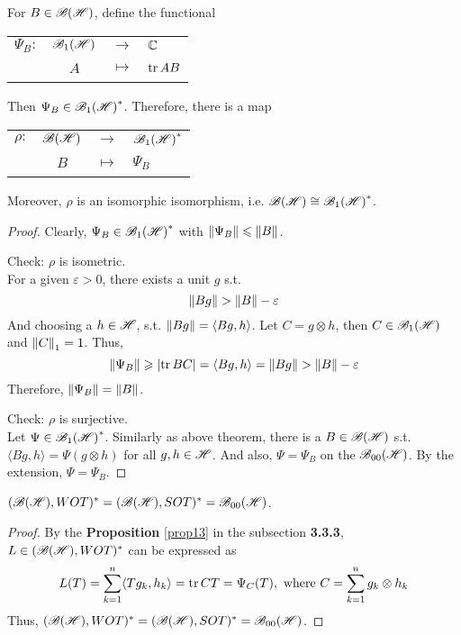 \documentclass[a4paper,11pt]{report}
\begin{document}
\begin{thm}
	For $B \in \mathscr{B(H)}$, define the functional
	\begin{center}
		\begin{tabular}{l c c l}
			$\Psi_B \colon$ & $\mathscr{B}_{1}\mathscr{(H)}$ & $\longrightarrow$ & $\mathbb{C}$ \\
			~ & $A$ & $\longmapsto$ & $\operatorname{tr}{AB}$
		\end{tabular}
	\end{center}
	Then $\Psi_B \in \mathscr{B}_{1}\mathscr{(H)}^{*}$. Therefore, there is a map
	\begin{center}
		\begin{tabular}{l c c l}
			$\rho \colon$ & $\mathscr{B(H)}$ & $\longrightarrow$ & $\mathscr{B}_{1}\mathscr{(H)}^{*}$ \\
			~ & $B$ & $\longmapsto$ & $\Psi_B$
		\end{tabular}
	\end{center}
	Moreover, $\rho$ is an isomorphic isomorphism, i.e. $\mathscr{B(H)} \cong \mathscr{B}_{1}\mathscr{(H)}^{*}$. 
\end{thm}
\begin{proof}
	Clearly, $\Psi_B \in \mathscr{B}_{1}\mathscr{(H)}^{*}$ with $\left\lVert\Psi_B\right\lVert \leqslant \left\lVert B\right\lVert$.
	\item Check: $\rho$ is isometric. \\
	For a given $\varepsilon > 0$, there exists a unit $g$ s.t. 
	\begin{equation*}
		\left\lVert Bg\right\lVert > \left\lVert B\right\lVert-\varepsilon
	\end{equation*}
	And choosing a $h \in \mathscr{H}$, s.t. $\left\lVert Bg\right\lVert = \langle Bg,h \rangle$. Let $C = g \otimes h$, then $C \in \mathscr{B}_{1}\mathscr{(H)}$ and $\left\lVert C\right\lVert_1 = 1$.  Thus,
	\begin{equation*}
		\left\lVert\Psi_B\right\lVert \geqslant \left\lvert\operatorname{tr}{BC}\right\lvert = \langle Bg,h \rangle = \left\lVert Bg\right\lVert > \left\lVert B\right\lVert-\varepsilon
	\end{equation*}
	Therefore, $\left\lVert\Psi_B\right\lVert = \left\lVert B\right\lVert$.
	\item Check: $\rho$ is surjective.\\
	Let $\Psi \in \mathscr{B}_{1}\mathscr{(H)}^{*}$. Similarly as above theorem, there is a $B \in \mathscr{B(H)}$ s.t. $\langle Bg,h \rangle = \Psi(g \otimes h)$ for all $g,h \in \mathscr{H}$. And also, $\Psi = \Psi_B$ on the $\mathscr{B}_{00}\mathscr{(H)}$. By the extension, $\Psi = \Psi_B$.
\end{proof}

\begin{thm}
	$(\mathscr{B(H)}, WOT)^{*} = (\mathscr{B(H)}, SOT)^{*} = \mathscr{B}_{00}\mathscr{(H)}$.
\end{thm}
\begin{proof}
	By the \textbf{Proposition} \ref{prop13} in the subsection \textbf{3.3.3},  $L \in (\mathscr{B(H)}, WOT)^{*}$ can be expressed as
	\begin{equation*}
		L(T) = \sum_{k=1}^n \langle Tg_k, h_k \rangle = \operatorname{tr}{CT} = \Psi_C(T), \text{ where } C = \sum_{k=1}^n g_k \otimes h_k
	\end{equation*}
	Thus, $(\mathscr{B(H)}, WOT)^{*} = (\mathscr{B(H)}, SOT)^{*} = \mathscr{B}_{00}\mathscr{(H)}$.
\end{proof}
\end{document}
